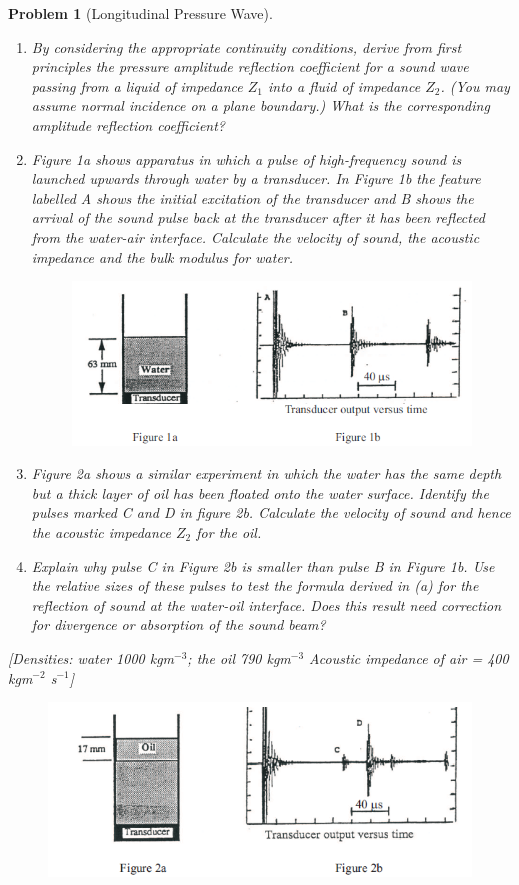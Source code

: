 \documentclass[a4paper]{article}
\theoremstyle{new}
\newtheorem{qns}{Problem}[section]
\begin{document}
\newpage
\begin{qns}[Longitudinal Pressure Wave]\leavevmode
\begin{enumerate}[label=(\alph*)]
\item By considering the appropriate continuity conditions, derive from first principles the pressure amplitude reflection coefficient for a sound wave passing from a liquid of impedance $Z_1$ into a fluid of impedance $Z_2$. (You may assume normal incidence on a plane boundary.) What is the corresponding amplitude reflection coefficient?
\item Figure 1a shows apparatus in which a pulse of high-frequency sound is launched upwards through water by a transducer. In Figure 1b the feature labelled A shows the initial excitation of the transducer and B shows the arrival of the sound pulse back at the transducer after it has been reflected from the water-air interface. Calculate the velocity of sound, the acoustic impedance and the bulk modulus for water.
\begin{figure}[H]
    \centering
    \includegraphics[width=\linewidth]{2_13i.PNG}
\end{figure}
\item Figure 2a shows a similar experiment in which the water has the same depth but a thick layer of oil has been floated onto the water surface. Identify the pulses marked C and D in figure 2b. Calculate the velocity of sound and hence the acoustic impedance $Z_2$ for the oil.
\item Explain why pulse C in Figure 2b is smaller than pulse B in Figure 1b. Use the relative sizes of these pulses to test the formula derived in (a) for the reflection of sound at the water-oil interface. Does this result need correction for divergence or absorption of the sound beam?
\end{enumerate}
[Densities: water 1000 kgm$^{-3}$; the oil 790 kgm$^{-3}$ Acoustic impedance of air = 400 kgm$^{-2}$ s$^{-1}$]
\begin{figure}[H]
    \centering
    \includegraphics[width=\linewidth]{2_13ii.PNG}
\end{figure}
\end{qns}
\end{document}
